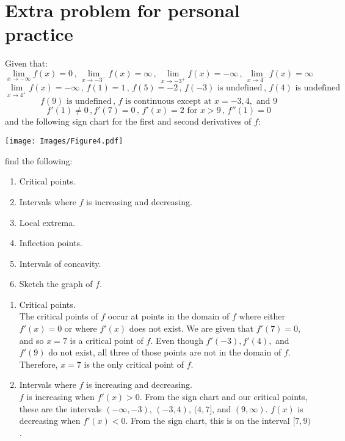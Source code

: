 \documentclass[handout,nooutcomes]{ximera}
\renewenvironment{freeResponse}{
\ifhandout\setbox0\vbox\bgroup\else
\begin{trivlist}\item[\hskip \labelsep\bfseries Solution:\hspace{2ex}]
\fi}
{\ifhandout\egroup\else
\end{trivlist}
\fi}
\begin{document}
\section{Extra problem for personal practice}
\begin{problem}
  Given that:
  \[
    \lim_{x \to - \infty} f(x) = 0 \, , \, \lim_{x \to -3^-} f(x) = \infty \, , \, \lim_{x \to -3^+} f(x) = - \infty \, , \, \lim_{x \to 4^-} f(x) = \infty
  \]
  \[ 
  \lim_{x \to 4^+} f(x) = -\infty \, , \, f(1) = 1 \, , \, f(5) = -2 \, , \, f(-3) \text{ is undefined} \, , \, f(4) \text{ is undefined}
  \]
  \[
  f(9) \text{ is undefined} \, , \, f \text{ is continuous except at } x=-3, 4, \text{ and } 9 
  \]
  \[
    f'(1) \ne 0\, ,f'(7) = 0 \, , \, f'(x) = 2 \text{ for } x > 9 \, , \, f''(1) = 0
  \]
  and the following sign chart for the first and second derivatives of $f$:
  \begin{image}
    \texttt{[image: Images/Figure4.pdf]}
  \end{image}
	
find the following:
  \begin{enumerate}
     \item  Critical points.
     \item  Intervals where $f$ is increasing and decreasing.
     \item  Local extrema.
     \item  Inflection points.
     \item  Intervals of concavity.
     \item  Sketch the graph of $f$.
	
  \end{enumerate}
  \begin{freeResponse}
    \begin{enumerate}
      \item
        Critical points. \\
	The critical points of $f$ occur at points in the domain of $f$ where either $f'(x)=0$ or where $f'(x)$ does not exist.
        We are given that $f'(7)=0$, and so $x=7$ is a critical point of $f$.
        Even though $f'(-3), f'(4),$ and $f'(9)$ do not exist, all three of those points are not in the domain of $f$.
        Therefore, $x=7$ is the only critical point of $f$.  
			
      \item
        Intervals where $f$ is increasing and decreasing.  \\
        $f$ is increasing when $f'(x)>0$.
        From the sign chart and our critical points, these are the intervals $(-\infty ,-3)$, $(-3,4)$, $(4,7]$, and $(9,\infty )$.
        $f(x)$ is decreasing when $f'(x)<0$.
        From the sign chart, this is on the interval $[7,9)$.
			

\end{enumerate}
\end{freeResponse}
\end{problem}
\end{document}
